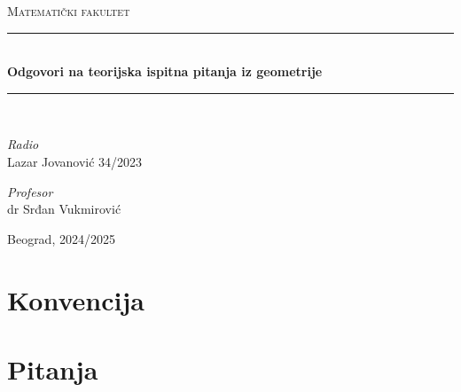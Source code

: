 \documentclass[12pt]{article}
\begin{document}
\begin{titlepage}

    \newcommand{\HRule}{\rule{\linewidth}{0.4mm}}
    \center
    \textsc{\LARGE Matematički fakultet}\\[5cm]

    \HRule\\[0.4cm]
    {\LARGE\bfseries Odgovori na teorijska ispitna pitanja iz geometrije}\\[0.2cm]
    \HRule\\[2cm]

    \vspace{17\baselineskip}
    \begin{minipage}[t]{0.4\textwidth}
        \begin{flushleft}
            \large
            \textit{Radio}\\
            Lazar Jovanović 34/2023
        \end{flushleft}
    \end{minipage}
    \hspace*{1cm}
    \begin{minipage}[t]{0.4\textwidth}
        \begin{flushright}
            \large
            \textit{Profesor}\\
            dr Srđan Vukmirović
        \end{flushright}
    \end{minipage}

    \vfill\vfill\vfill\vfill
    {\large Beograd, 2024/2025}
    \vfill

\end{titlepage}

\tableofcontents
\newpage

\section{Konvencija}

\newpage

\section{Pitanja}
\end{document}

